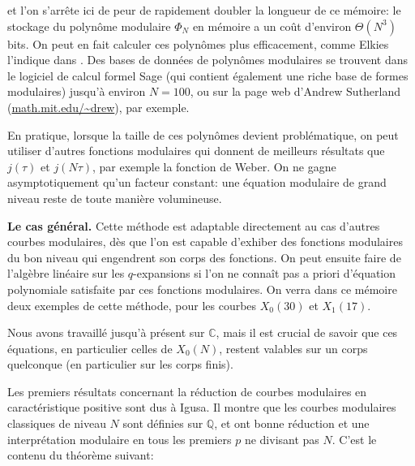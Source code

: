 \documentclass[11pt,a4paper]{article}
\newcommand{\C}{\mathbb{C}}
\newcommand{\Q}{\mathbb{Q}}
\renewcommand{\v}{\vspace{5mm}}
\theoremstyle{definition}
\begin{document}
et l'on s'arrête ici de peur de rapidement doubler la longueur de ce mémoire: le stockage du polynôme modulaire $\Phi_N$ en mémoire a un coût d'environ $\Theta(N^3)$ bits. On peut en fait calculer ces polynômes plus efficacement, comme Elkies l'indique dans \cite{Elkies}.
Des bases de données de polynômes modulaires se trouvent dans le logiciel de calcul formel Sage \cite{Sage} (qui contient également une riche base de formes modulaires) jusqu'à environ $N = 100$, ou sur la page web d'Andrew Sutherland (\url{math.mit.edu/~drew}), par exemple.

En pratique, lorsque la taille de ces polynômes devient problématique, on peut utiliser d'autres fonctions modulaires qui donnent de meilleurs résultats que $j(\tau)$ et $j(N\tau)$, par exemple la fonction de Weber. On ne gagne asymptotiquement qu'un facteur constant: une équation modulaire de grand niveau reste de toute manière volumineuse.

\v

\textbf{Le cas général.} Cette méthode est adaptable directement au cas d'autres courbes modulaires, dès que l'on est capable d'exhiber des fonctions modulaires du bon niveau qui engendrent son corps des fonctions. On peut ensuite faire de l'algèbre linéaire sur les $q$-expansions si l'on ne connaît pas a priori d'équation polynomiale satisfaite par ces fonctions modulaires. On verra dans ce mémoire deux exemples de cette méthode, pour les courbes $X_0(30)$ et $X_1(17)$.

Nous avons travaillé jusqu'à présent sur $\C$, mais il est crucial de savoir que ces équations, en particulier celles de $X_0(N)$, restent valables sur un corps quelconque (en particulier sur les corps finis).

Les premiers résultats concernant la réduction de courbes modulaires en caractéristique positive sont dus à Igusa. Il montre que les courbes modulaires classiques de niveau $N$ sont définies sur $\Q$, et ont bonne réduction et une interprétation modulaire en tous les premiers $p$ ne divisant pas $N$. C'est le contenu du théorème suivant:
\end{document}
